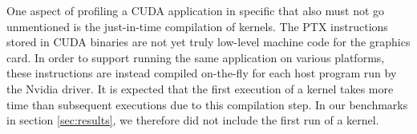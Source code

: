 One aspect of profiling a CUDA application in specific that also must not go unmentioned is the just-in-time compilation of kernels. The PTX instructions stored in CUDA binaries are not yet truly low-level machine code for the graphics card. In order to support running the same application on various platforms, these instructions are instead compiled on-the-fly for each host program run by the Nvidia driver. It is expected that the first execution of a kernel takes more time than subsequent executions due to this compilation step. In our benchmarks in section \ref{sec:results}, we therefore did not include the first run of a kernel.